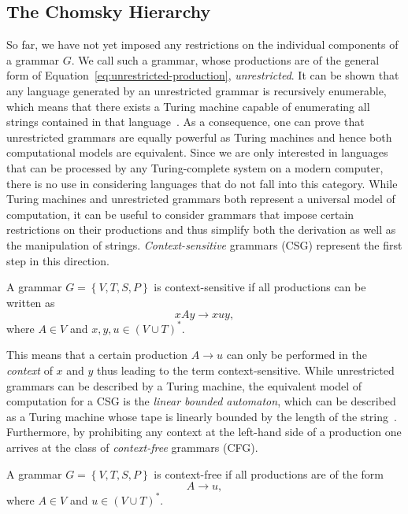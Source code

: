 \subsection{The Chomsky Hierarchy}
\label{sec:chomsky-hierarchy}
So far, we have not yet imposed any restrictions on the individual components of a grammar $G$.
We call such a grammar, whose productions are of the general form of Equation~\eqref{eq:unrestricted-production}, \emph{unrestricted}.
It can be shown that any language generated by an unrestricted grammar is recursively enumerable, which means that there exists a Turing machine capable of enumerating all strings contained in that language~\cite{linz2006introduction}.
As a consequence, one can prove that unrestricted grammars are equally powerful as Turing machines and hence both computational models are equivalent.
Since we are only interested in languages that can be processed by any Turing-complete system on a modern computer, there is no use in considering languages that do not fall into this category.
While Turing machines and unrestricted grammars both represent a universal model of computation, it can be useful to consider grammars that impose certain restrictions on their productions and thus simplify both the derivation as well as the manipulation of strings.
\emph{Context-sensitive} grammars (CSG) represent the first step in this direction.
\begin{definition}
A grammar $G = \left\{V, T, S, P\right\}$ is context-sensitive if all productions can be written as
\begin{equation}
	xAy \to xuy,
\end{equation}
where $A \in V$ and $x, y, u \in \left(V \cup T\right)^*$.
\label{def:context-sensitive-grammar}
\end{definition}
This means that a certain production $A \to u$ can only be performed in the \emph{context} of $x$ and $y$ thus leading to the term context-sensitive.
While unrestricted grammars can be described by a Turing machine, the equivalent model of computation for a CSG is the \emph{linear bounded automaton}, which can be described as a Turing machine whose tape is linearly bounded by the length of the string~\cite{linz2006introduction}.
Furthermore, by prohibiting any context at the left-hand side of a production one arrives at the class of \emph{context-free} grammars (CFG).
\begin{definition}
	A grammar $G = \left\{V, T, S, P\right\}$ is context-free if all productions are of the form
	\begin{equation}
		A \to u,
	\end{equation}
	where $A \in V$ and $u \in \left(V \cup T\right)^*$.
\end{definition}
